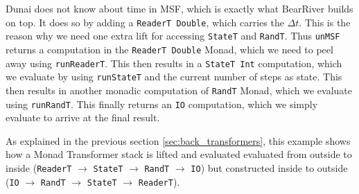 Dunai does not know about time in MSF, which is exactly what BearRiver builds on top. It does so by adding a \texttt{ReaderT Double}, which carries the $\Delta t$. This is the reason why we need one extra lift for accessing \texttt{StateT} and \texttt{RandT}. Thus \texttt{unMSF} returns a computation in the \texttt{ReaderT Double} Monad, which we need to peel away using \texttt{runReaderT}. This then results in a \texttt{StateT Int} computation, which we evaluate by using \texttt{runStateT} and the current number of steps as state. This then results in another monadic computation of \texttt{RandT} Monad, which we evaluate using \texttt{runRandT}. This finally returns an \texttt{IO} computation, which we simply evaluate to arrive at the final result.

As explained in the previous section \ref{sec:back_transformers}, this example shows how a Monad Transformer stack is lifted and evaluated evaluated from outside to inside (\texttt{ReaderT} $\rightarrow$ \texttt{StateT} $\rightarrow$ \texttt{RandT} $\rightarrow$ \texttt{IO}) but constructed inside to outside (\texttt{IO} $\rightarrow$ \texttt{RandT} $\rightarrow$ \texttt{StateT} $\rightarrow$ \texttt{ReaderT}).